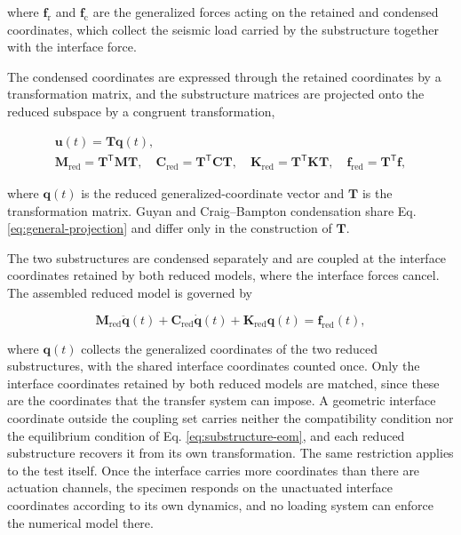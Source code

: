 \documentclass[a4paper,fleqn,review,12pt]{cas-sc}
\numberwithin{equation}{section}
\begin{document}
\noindent where \(\bm{f}_{\mathrm{r}}\) and \(\bm{f}_{\mathrm{c}}\) are the generalized forces acting on the retained and condensed coordinates, which collect the seismic load carried by the substructure together with the interface force.

The condensed coordinates are expressed through the retained coordinates by a transformation matrix, and the substructure matrices are projected onto the reduced subspace by a congruent transformation,

\vspace{-3.5em}
\begin{equation}
	\begin{gathered}
		\bm{u}(t)=\mathbf{T}\bm{q}(t),\\
		\mathbf{M}_{\mathrm{red}}=\mathbf{T}^{\mathsf{T}}\mathbf{M}\mathbf{T},\quad
		\mathbf{C}_{\mathrm{red}}=\mathbf{T}^{\mathsf{T}}\mathbf{C}\mathbf{T},\quad
		\mathbf{K}_{\mathrm{red}}=\mathbf{T}^{\mathsf{T}}\mathbf{K}\mathbf{T},\quad
		\bm{f}_{\mathrm{red}}=\mathbf{T}^{\mathsf{T}}\bm{f},
	\end{gathered}
	\label{eq:general-projection}
\end{equation}
\vspace{-3.5em}

\noindent where \(\bm{q}(t)\) is the reduced generalized-coordinate vector and \(\mathbf{T}\) is the transformation matrix. Guyan and Craig--Bampton condensation share Eq. \eqref{eq:general-projection} and differ only in the construction of \(\mathbf{T}\).

The two substructures are condensed separately and are coupled at the interface coordinates retained by both reduced models, where the interface forces cancel. The assembled reduced model is governed by

\vspace{-3.5em}
\begin{equation}
	\mathbf{M}_{\mathrm{red}}\ddot{\bm{q}}(t)
	+\mathbf{C}_{\mathrm{red}}\dot{\bm{q}}(t)
	+\mathbf{K}_{\mathrm{red}}\bm{q}(t)
	=\bm{f}_{\mathrm{red}}(t),
	\label{eq:assembled-reduced}
\end{equation}
\vspace{-3.5em}

\noindent where \(\bm{q}(t)\) collects the generalized coordinates of the two reduced substructures, with the shared interface coordinates counted once. Only the interface coordinates retained by both reduced models are matched, since these are the coordinates that the transfer system can impose. A geometric interface coordinate outside the coupling set carries neither the compatibility condition nor the equilibrium condition of Eq. \eqref{eq:substructure-eom}, and each reduced substructure recovers it from its own transformation. The same restriction applies to the test itself. Once the interface carries more coordinates than there are actuation channels, the specimen responds on the unactuated interface coordinates according to its own dynamics, and no loading system can enforce the numerical model there.
\end{document}
